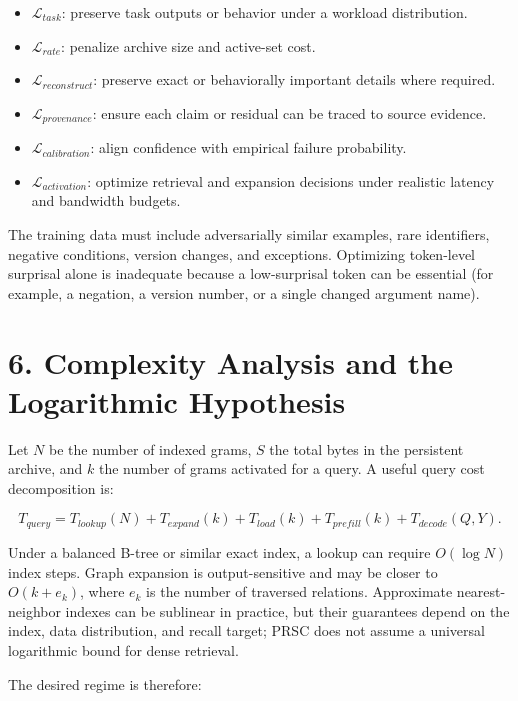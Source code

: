 \documentclass[
  10pt,
]{article}
\providecommand{\tightlist}{%
  \setlength{\itemsep}{0pt}\setlength{\parskip}{0pt}}
\begin{document}
\begin{itemize}
\tightlist
\item
  \(\mathcal{L}_{task}\): preserve task outputs or behavior under a
  workload distribution.
\item
  \(\mathcal{L}_{rate}\): penalize archive size and active-set cost.
\item
  \(\mathcal{L}_{reconstruct}\): preserve exact or behaviorally
  important details where required.
\item
  \(\mathcal{L}_{provenance}\): ensure each claim or residual can be
  traced to source evidence.
\item
  \(\mathcal{L}_{calibration}\): align confidence with empirical failure
  probability.
\item
  \(\mathcal{L}_{activation}\): optimize retrieval and expansion
  decisions under realistic latency and bandwidth budgets.
\end{itemize}

The training data must include adversarially similar examples, rare
identifiers, negative conditions, version changes, and exceptions.
Optimizing token-level surprisal alone is inadequate because a
low-surprisal token can be essential (for example, a negation, a version
number, or a single changed argument name).

\section{6. Complexity Analysis and the Logarithmic
Hypothesis}\label{complexity-analysis-and-the-logarithmic-hypothesis}

Let \(N\) be the number of indexed grams, \(S\) the total bytes in the
persistent archive, and \(k\) the number of grams activated for a query.
A useful query cost decomposition is:

\[
T_{query} = T_{lookup}(N) + T_{expand}(k) + T_{load}(k) + T_{prefill}(k) + T_{decode}(Q,Y).
\]

Under a balanced B-tree or similar exact index, a lookup can require
\(O(\log N)\) index steps. Graph expansion is output-sensitive and may
be closer to \(O(k + e_k)\), where \(e_k\) is the number of traversed
relations. Approximate nearest-neighbor indexes can be sublinear in
practice, but their guarantees depend on the index, data distribution,
and recall target; PRSC does not assume a universal logarithmic bound
for dense retrieval.

The desired regime is therefore:
\end{document}
